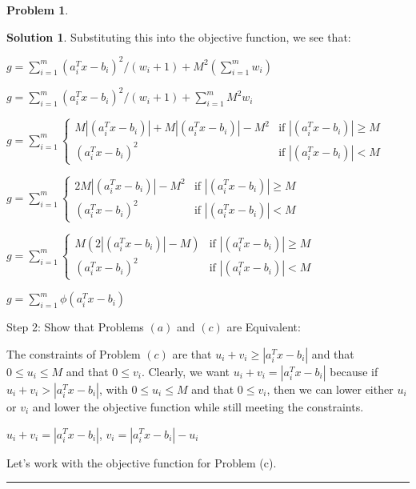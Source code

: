 \documentclass{article}
\theoremstyle{definition}
\newtheorem{problem}{Problem}
\def\fline{\rule{0.75\linewidth}{0.5pt}}
\newcommand{\finishline}{\begin{center}\fline\end{center}}
\newtheorem*{solution*}{Solution}
\newenvironment{solution}{\begin{solution*}}{{\finishline} \end{solution*}}
\begin{document}
\begin{problem}
\begin{solution}
Substituting this into the objective function, we see that: \newline 

$g = \sum_{i=1}^{m} (a_i^T x - b_i)^2/(w_i + 1) + M^2(\sum_{i=1}^{m} w_i)$ \newline 

$g = \sum_{i=1}^{m} (a_i^T x - b_i)^2/(w_i + 1) + \sum_{i=1}^{m} M^2 w_i$ \newline 

$g = \sum_{i=1}^{m} \begin{cases} 
      M|(a_i^T x - b_i)| + M|(a_i^T x - b_i)| - M^2  & \text{if }  |(a_i^T x - b_i)| \geq M \\
      (a_i^T x - b_i)^2 & \text{if } |(a_i^T x - b_i)| < M
   \end{cases}$ \newline 

$g = \sum_{i=1}^{m} \begin{cases} 
      2M|(a_i^T x - b_i)| - M^2  & \text{if }  |(a_i^T x - b_i)| \geq M \\
      (a_i^T x - b_i)^2 & \text{if } |(a_i^T x - b_i)| < M
   \end{cases}$ \newline 

$g = \sum_{i=1}^{m} \begin{cases} 
      M(2|(a_i^T x - b_i)| - M)  & \text{if }  |(a_i^T x - b_i)| \geq M \\
      (a_i^T x - b_i)^2 & \text{if } |(a_i^T x - b_i)| < M
   \end{cases}$ \newline 

$g = \sum_{i=1}^{m} \phi(a_i^T x - b_i)$ \newline 

Step 2: Show that Problems $(a)$ and $(c)$ are Equivalent: \newline 

    The constraints of Problem $(c)$ are that $u_i + v_i \geq |a_i^T x - b_i|$ and that $0 \leq u_i \leq M$ and that $0 \leq v_i$. Clearly, we want $u_i + v_i = |a_i^T x - b_i|$ because if $u_i + v_i > |a_i^T x - b_i|$, with $0 \leq u_i \leq M$ and that $0 \leq v_i$, then we can lower either $u_i$ or $v_i$ and lower the objective function while still meeting the constraints. 

    $u_i + v_i = |a_i^T x - b_i|$, $v_i = |a_i^T x - b_i| - u_i$

Let's work with the objective function for Problem (c). \newline 


\end{solution}
\end{problem}
\end{document}
